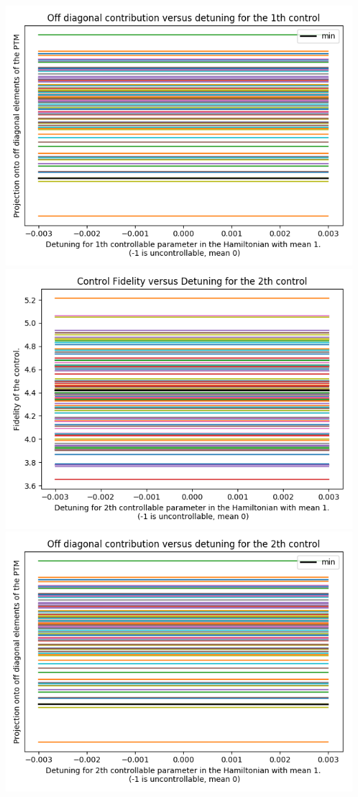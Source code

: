 \documentclass{article}
\begin{document}
\begin{center}
\includegraphics[scale=.9]{off_diag_2}
\includegraphics[scale=.9]{control_fid_3}
\includegraphics[scale=.9]{off_diag_3}

\end{center}
\end{document}
